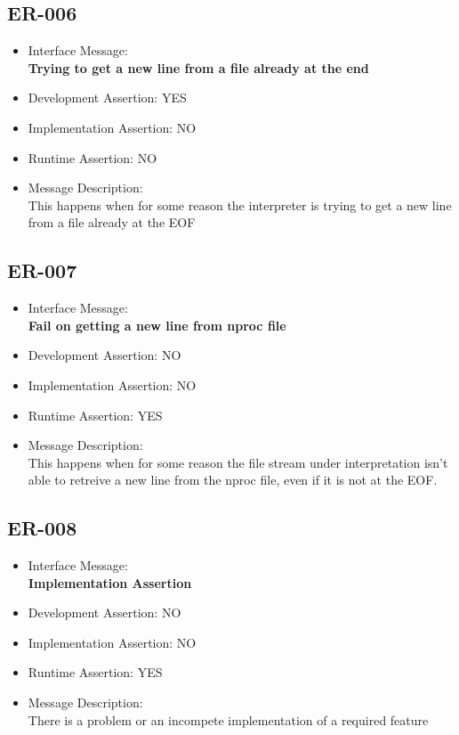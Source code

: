 \subsection{ER-006}
\begin{itemize}
  \item Interface Message:\\[1em]
    \textbf{Trying to get a new line from a file already at the end}
  \item Development Assertion: YES
  \item Implementation Assertion: NO
  \item Runtime Assertion: NO
  \item Message Description:\\[1em]
    This happens when for some reason the interpreter is trying to get a new line from a file already at the EOF
\end{itemize}

\subsection{ER-007}
\begin{itemize}
  \item Interface Message:\\[1em]
    \textbf{Fail on getting a new line from nproc file}
  \item Development Assertion: NO
  \item Implementation Assertion: NO
  \item Runtime Assertion: YES
  \item Message Description:\\[1em]
    This happens when for some reason the file stream under interpretation isn't able to retreive a new line from the nproc file, even if it is not at the EOF.
\end{itemize}

\subsection{ER-008}
\begin{itemize}
  \item Interface Message:\\[1em]
    \textbf{Implementation Assertion}
  \item Development Assertion: NO
  \item Implementation Assertion: NO
  \item Runtime Assertion: YES
  \item Message Description:\\[1em]
    There is a problem or an incompete implementation of a required feature
\end{itemize}

